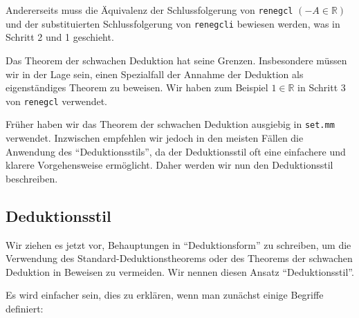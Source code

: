 Andererseits muss die Äquivalenz der Schlussfolgerung von \texttt{renegcl} $( - A \in \mathbb{R} )$ und der substituierten Schlussfolgerung von \texttt{renegcli} bewiesen werden, was in Schritt 2 und 1 geschieht.

Das Theorem der schwachen Deduktion hat seine Grenzen. Insbesondere müssen wir in der Lage sein, einen Spezialfall der Annahme der Deduktion als eigenständiges Theorem zu beweisen. Wir haben zum Beispiel $1 \in \mathbb{R}$ in Schritt 3 von \texttt{renegcl} verwendet.

Früher haben wir das Theorem der schwachen Deduktion ausgiebig in \texttt{set.mm} verwendet. Inzwischen empfehlen wir jedoch in den meisten Fällen die Anwendung des "`Deduktionsstils"', da der Deduktionsstil oft eine einfachere und klarere Vorgehensweise ermöglicht. Daher werden wir nun den Deduktionsstil beschreiben.

\subsection{Deduktionsstil}\label{deductionstyle}

Wir ziehen es jetzt vor, Behauptungen in "`Deduktionsform"' zu schreiben, um die Verwendung des Standard-Deduktionstheorems oder des Theorems der schwachen Deduktion in Beweisen zu vermeiden. Wir nennen diesen Ansatz "`Deduktionsstil"'.

Es wird einfacher sein, dies zu erklären, wenn man zunächst einige Begriffe definiert:


